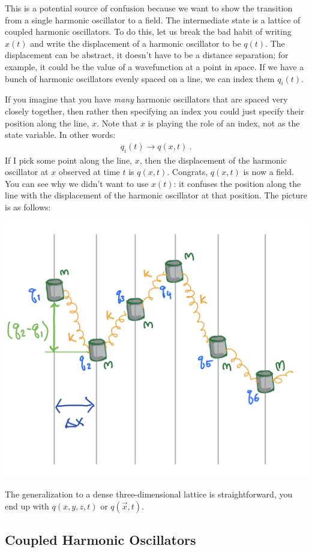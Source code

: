 This is a potential source of confusion because we want to show the transition from a single harmonic oscillator to a field. The intermediate state is a lattice of coupled harmonic oscillators. To do this, let us break the bad habit of writing $x(t)$ and write the displacement of a harmonic oscillator to be $q(t)$. The displacement can be abstract, it doesn't have to be a distance separation; for example, it could be the value of a wavefunction at a point in space. If we have a bunch of harmonic oscillators evenly spaced on a line, we can index them $q_i(t)$. 

If you imagine that you have \emph{many} harmonic oscillators that are spaced very closely together, then rather then specifying an index you could just specify their position along the line, $x$. Note that $x$ is playing the role of an index, not as the state variable. In other words:
\begin{align}
	q_i(t) \to q(x,t) \ .
\end{align}
If I pick some point along the line, $x$, then the displacement of the harmonic oscillator at $x$ observed at time $t$ is $q(x,t)$. Congrats, $q(x,t)$ is now a field. You can see why we didn't want to use $x(t)$: it confuses the position along the line with the displacement of the harmonic oscillator at that position. 
%
The picture is as follows:
\begin{center}
\includegraphics[width=.5\textwidth]{figures/coupledHO.jpg}
\end{center}
The generalization to a dense three-dimensional lattice is straightforward, you end up with $q(x,y,z,t)$ or $q(\vec{x},t)$.


\subsection{Coupled Harmonic Oscillators}
\label{sec:CHO}

